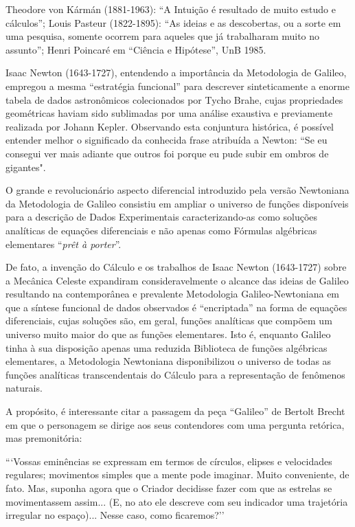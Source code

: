     Theodore von Kármán (1881-1963): ``A Intuição é resultado de muito estudo e cálculos''; Louis Pasteur (1822-1895): ``As ideias e as descobertas, ou a sorte em uma pesquisa, somente ocorrem para aqueles que já trabalharam muito no assunto''; Henri Poincaré em ``Ciência e Hipótese'', UnB 1985.

    Isaac Newton (1643-1727), entendendo a importância da Metodologia de Galileo, empregou a mesma ``estratégia funcional'' para descrever sinteticamente a enorme tabela de dados astronômicos colecionados por Tycho Brahe, cujas propriedades geométricas haviam sido sublimadas por uma análise exaustiva e previamente realizada por Johann Kepler. Observando esta conjuntura histórica, é possível entender melhor o significado da conhecida frase atribuída a Newton: ``Se eu consegui ver mais adiante que outros foi porque eu pude subir em ombros de gigantes".

    O grande e revolucionário aspecto diferencial introduzido pela versão Newtoniana da Metodologia de Galileo consistiu em ampliar o universo de funções disponíveis para a descrição de Dados Experimentais caracterizando-as como soluções analíticas de equações diferenciais e não apenas como Fórmulas algébricas elementares ``\textit{prêt à porter}''.

    De fato, a invenção do Cálculo e os trabalhos de Isaac Newton (1643-1727) sobre a Mecânica Celeste expandiram consideravelmente o alcance das ideias de Galileo resultando na contemporânea e prevalente Metodologia Galileo-Newtoniana em que a síntese funcional de dados observados é ``encriptada'' na forma de equações diferenciais, cujas soluções são, em geral, funções analíticas que compõem um universo muito maior do que as funções elementares. Isto é, enquanto Galileo tinha à sua disposição apenas uma reduzida Biblioteca de funções algébricas elementares, a Metodologia Newtoniana disponibilizou o universo de todas as funções analíticas transcendentais do Cálculo para a representação de fenômenos naturais.

    A propósito, é interessante citar a passagem da peça ``Galileo'' de Bertolt Brecht em que o personagem se dirige aos seus contendores com uma pergunta retórica, mas premonitória:

\begin{citacao}
```Vossas eminências se expressam em termos de círculos, elipses e velocidades regulares; movimentos simples que a mente pode imaginar. Muito conveniente, de fato. Mas, suponha agora que o Criador decidisse fazer com que as estrelas se movimentassem assim... (E, no ato ele descreve com seu indicador uma trajetória irregular no espaço)... Nesse caso, como ficaremos?''
\end{citacao}

